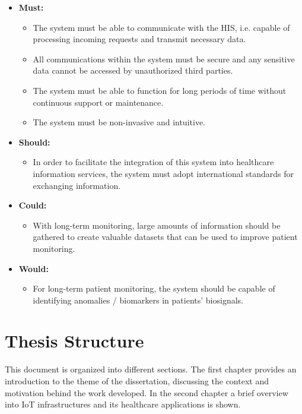 \begin{itemize}
    \item \textbf{Must:}
    \begin{itemize}
        \item The system must be able to communicate with the \acs{HIS}, i.e. capable of processing incoming requests and transmit necessary data.
        \item All communications within the system must be secure and any sensitive data cannot be accessed by unauthorized third parties.
        \item The system must be able to function for long periods of time without continuous support or maintenance.
        \item The system must be non-invasive and intuitive.
    \end{itemize}
    \item \textbf{Should:}
    \begin{itemize}   
        \item In order to facilitate the integration of this system into healthcare information services, the system must adopt international standards for exchanging information.
    \end{itemize}
    \item \textbf{Could:}
    \begin{itemize}
        \item With long-term monitoring, large amounts of information should be gathered to create valuable datasets that can be used to improve patient monitoring.
    \end{itemize}
    \item \textbf{Would:}
    \begin{itemize}
        \item For long-term patient monitoring, the system should be capable of identifying anomalies / biomarkers in patients' biosignals.
    \end{itemize}
\end{itemize}

\section{Thesis Structure}

This document is organized into different sections. The first chapter provides an introduction to the theme of the dissertation, discussing the context and motivation behind the work developed. In the second chapter a brief overview into \acs{IoT} infrastructures and its healthcare applications is shown. 